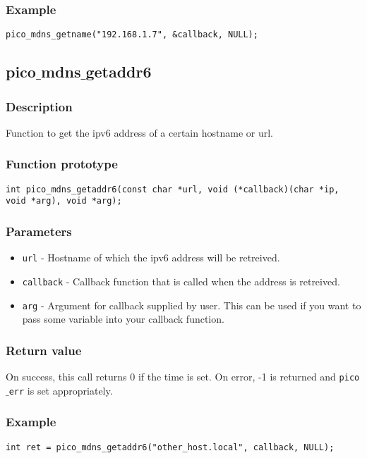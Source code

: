 \subsubsection*{Example}
\begin{verbatim}
pico_mdns_getname("192.168.1.7", &callback, NULL);
\end{verbatim}


\subsection{pico$\_$mdns$\_$getaddr6}

\subsubsection*{Description}
Function to get the ipv6 address of a certain hostname or url.

\subsubsection*{Function prototype}
\begin{verbatim}
int pico_mdns_getaddr6(const char *url, void (*callback)(char *ip, void *arg), void *arg);
\end{verbatim}

\subsubsection*{Parameters}
\begin{itemize}[noitemsep]
\item \texttt{url} - Hostname of which the ipv6 address will be retreived.
\item \texttt{callback} - Callback function that is called when the address is retreived.
\item \texttt{arg} - Argument for callback supplied by user. This can be used if you want to pass some variable into your callback function.
\end{itemize}

\subsubsection*{Return value}
On success, this call returns 0 if the time is set.
On error, -1 is returned and \texttt{pico$\_$err} is set appropriately.

\subsubsection*{Example}
\begin{verbatim}
int ret = pico_mdns_getaddr6("other_host.local", callback, NULL);
\end{verbatim}



